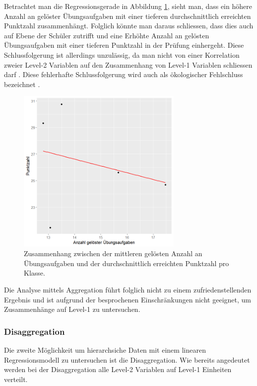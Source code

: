\documentclass[12pt]{article}\usepackage[]{graphicx}\usepackage[]{color}
\begin{document}
Betrachtet man die Regressionsgerade in Abbildung \ref{fig:aggregiert}, sieht man, dass ein höhere Anzahl an gelöster Übungsaufgaben mit einer tieferen durchschnittlich erreichten Punktzahl zusammenhängt. Folglich könnte man daraus schliessen, dass dies auch auf Ebene der Schüler zutrifft und eine Erhöhte Anzahl an gelösten Übungsaufgaben mit einer tieferen Punktzahl in der Prüfung einhergeht. Diese Schlussfolgerung ist allerdings unzulässig, da man nicht von einer Korrelation zweier Level-2 Variablen auf den Zusammenhang von Level-1 Variablen schliessen darf \citep{SnijdersTomA.B2012Ma:a}.  Diese fehlerhafte Schlussfolgerung wird auch als ökologischer Fehlschluss bezeichnet \citep{robinson2009ecological}.

\begin{figure}[b!]
\centering
\captionsetup{width=8cm}
\includegraphics[width = 8cm, height = 8cm]{./figures/aggregation}
\caption{Zusammenhang zwischen der mittleren gelösten Anzahl an Übungsaufgaben und der durchschnittlich erreichten Punktzahl pro Klasse.}
\label{fig:aggregiert}
\end{figure}

Die Analyse mittels Aggregation führt folglich nicht zu einem zufriedenstellenden Ergebnis und ist aufgrund der besprochenen Einschränkungen nicht geeignet, um Zusammenhänge auf Level-1 zu untersuchen.

\subsubsection{Disaggregation} \label{section:disaggregation}
Die zweite Möglichkeit um hierarchsiche Daten mit einem linearen Regressionsmodell zu untersuchen ist die Disaggregation. Wie bereits angedeutet werden bei der Disaggregation alle Level-2 Variablen auf Level-1 Einheiten verteilt. 
\end{document}

